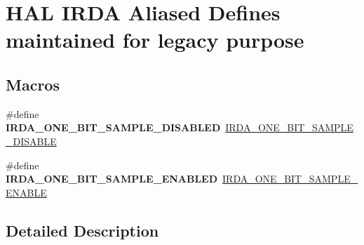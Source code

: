 \hypertarget{group___h_a_l___i_r_d_a___aliased___defines}{}\section{H\+AL I\+R\+DA Aliased Defines maintained for legacy purpose}
\label{group___h_a_l___i_r_d_a___aliased___defines}
\subsection*{Macros}
\begin{DoxyCompactItemize}
\item 
\mbox{\label{group___h_a_l___i_r_d_a___aliased___defines_ga6f70dd7c72bca98600a31c076319d651}} 
\#define {\bfseries I\+R\+D\+A\+\_\+\+O\+N\+E\+\_\+\+B\+I\+T\+\_\+\+S\+A\+M\+P\+L\+E\+\_\+\+D\+I\+S\+A\+B\+L\+ED}~\hyperlink{group___i_r_d_a___one___bit_ga373ec0d11671c4a4d2d2c0dd646d976c}{I\+R\+D\+A\+\_\+\+O\+N\+E\+\_\+\+B\+I\+T\+\_\+\+S\+A\+M\+P\+L\+E\+\_\+\+D\+I\+S\+A\+B\+LE}
\item 
\mbox{\label{group___h_a_l___i_r_d_a___aliased___defines_gae1d975f79449d0fa7881f280ec5c403e}} 
\#define {\bfseries I\+R\+D\+A\+\_\+\+O\+N\+E\+\_\+\+B\+I\+T\+\_\+\+S\+A\+M\+P\+L\+E\+\_\+\+E\+N\+A\+B\+L\+ED}~\hyperlink{group___i_r_d_a___one___bit_ga0ff275354a873d6f9a37e982a7fdd1da}{I\+R\+D\+A\+\_\+\+O\+N\+E\+\_\+\+B\+I\+T\+\_\+\+S\+A\+M\+P\+L\+E\+\_\+\+E\+N\+A\+B\+LE}
\end{DoxyCompactItemize}


\subsection{Detailed Description}
